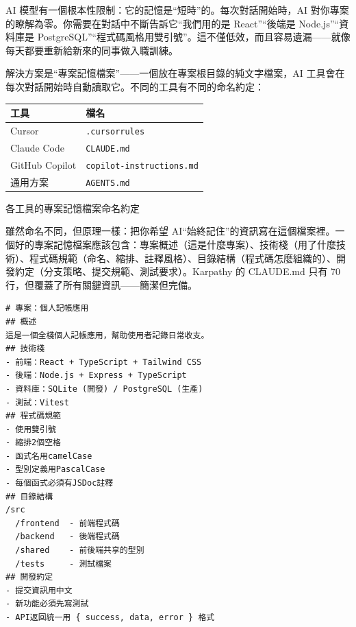 


AI 模型有一個根本性限制：它的記憶是“短時”的。每次對話開始時，AI 對你專案的瞭解為零。你需要在對話中不斷告訴它“我們用的是 React”“後端是 Node.js”“資料庫是 PostgreSQL”“程式碼風格用雙引號”。這不僅低效，而且容易遺漏——就像每天都要重新給新來的同事做入職訓練。

解決方案是“專案記憶檔案”——一個放在專案根目錄的純文字檔案，AI 工具會在每次對話開始時自動讀取它。不同的工具有不同的命名約定：

\begin{center}
\begin{tabularx}{\linewidth}{|X|X|}
\hline
\textbf{工具} & \textbf{檔名} \tabularnewline
\hline
Cursor & \texttt{.\allowbreak cursorrules} \tabularnewline
Claude Code & \texttt{CLAUDE.\allowbreak md} \tabularnewline
GitHub Copilot & \texttt{copilot-\allowbreak instructions.\allowbreak md} \tabularnewline
通用方案 & \texttt{AGENTS.\allowbreak md} \tabularnewline
\hline
\end{tabularx}
\end{center}

\begin{center}\small\color{gray}各工具的專案記憶檔案命名約定\end{center}

雖然命名不同，但原理一樣：把你希望 AI“始終記住”的資訊寫在這個檔案裡。一個好的專案記憶檔案應該包含：專案概述（這是什麼專案）、技術棧（用了什麼技術）、程式碼規範（命名、縮排、註釋風格）、目錄結構（程式碼怎麼組織的）、開發約定（分支策略、提交規範、測試要求）。Karpathy 的 CLAUDE.md 只有 70 行，但覆蓋了所有關鍵資訊——簡潔但完備。

\begin{lstlisting}
# 專案：個人記帳應用
## 概述
這是一個全棧個人記帳應用，幫助使用者記錄日常收支。
## 技術棧
- 前端：React + TypeScript + Tailwind CSS
- 後端：Node.js + Express + TypeScript
- 資料庫：SQLite (開發) / PostgreSQL (生產)
- 測試：Vitest
## 程式碼規範
- 使用雙引號
- 縮排2個空格
- 函式名用camelCase
- 型別定義用PascalCase
- 每個函式必須有JSDoc註釋
## 目錄結構
/src
  /frontend  - 前端程式碼
  /backend   - 後端程式碼
  /shared    - 前後端共享的型別
  /tests     - 測試檔案
## 開發約定
- 提交資訊用中文
- 新功能必須先寫測試
- API返回統一用 { success, data, error } 格式
\end{lstlisting}

